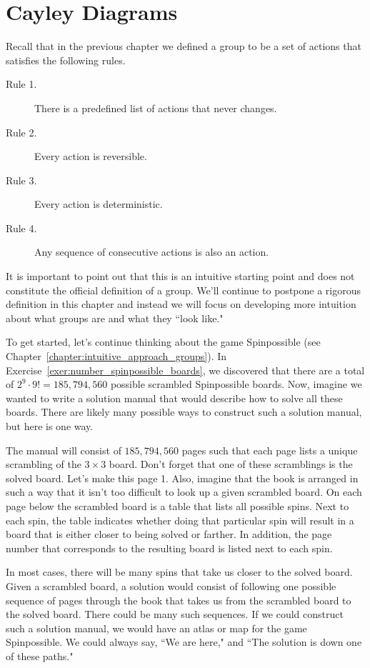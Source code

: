 \chapter{Cayley Diagrams}
\label{chapter:cayley_diagrams}
\thispagestyle{empty}

Recall that in the previous chapter we defined a group to be a set of actions that satisfies the following rules.

\begin{description}
\item[Rule 1.] There is a predefined list of actions that never changes.
\item[Rule 2.] Every action is reversible.
\item[Rule 3.] Every action is deterministic.
\item[Rule 4.] Any sequence of consecutive actions is also an action.
\end{description}

It is important to point out that this is an intuitive starting point and does not constitute the official definition of a group.  We'll continue to postpone a rigorous definition in this chapter and instead we will focus on developing more intuition about what groups are and what they ``look like."  

To get started, let's continue thinking about the game Spinpossible (see Chapter~\ref{chapter:intuitive_approach_groups}).  In Exercise~\ref{exer:number_spinpossible_boards}, we discovered that there are a total of \(2^9\cdot 9! = 185,794,560\) possible scrambled Spinpossible boards.  Now, imagine we wanted to write a solution manual that would describe how to solve all these boards.  There are likely many possible ways to construct such a solution manual, but here is one way.  

The manual will consist of \(185,794,560\) pages such that each page lists a unique scrambling of the \(3\times 3\) board.  Don't forget that one of these scramblings is the solved board.  Let's make this page 1.  Also, imagine that the book is arranged in such a way that it isn't too difficult to look up a given scrambled board.  On each page below the scrambled board is a table that lists all possible spins.  Next to each spin, the table indicates whether doing that particular spin will result in a board that is either closer to being solved or farther.  In addition, the page number that corresponds to the resulting board is listed next to each spin.

In most cases, there will be many spins that take us closer to the solved board.  Given a scrambled board, a solution would consist of following one possible sequence of pages through the book that takes us from the scrambled board to the solved board.  There could be many such sequences.  If we could construct such a solution manual, we would have an atlas or map for the game Spinpossible.  We could always say, ``We are here," and ``The solution is down one of these paths."

